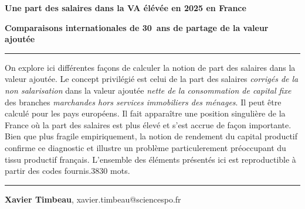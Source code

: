 \documentclass[
  french,
  9pt,
  a4paper,
]{article}
\renewcommand*\contentsname{Table des matières}
\newcommand\contentsname{Table des matières}
\begin{document}
\begin{titlepage}
\newpage
\pagestyle{empty}
\newpage
\pagestyle{empty}
 
\LARGE\textbf{Une part des salaires dans la VA élévée en 2025 en France}

\large\textbf{Comparaisons internationales de 30~ans de partage de la
valeur ajoutée}

\vspace{1cm}


\par\rule{\textwidth}{0.5pt}

On explore ici différentes façons de calculer la notion de part des
salaires dans la valeur ajoutée. Le concept privilégié est celui de la
part des salaires \emph{corrigés de la non salarisation} dans la valeur
ajoutée \emph{nette de la consommation de capital fixe} des branches
\emph{marchandes hors services immobiliers des ménages}. Il peut être
calculé pour les pays européens. Il fait apparaître une position
singulière de la France où la part des salaires est plus élevé et s'est
accrue de façon importante. Bien que plus fragile empiriquement, la
notion de rendement du capital productif confirme ce diagnostic et
illustre un problème particulerement préoccupant du tissu productif
français. L'ensemble des éléments présentés ici est reproductible à
partir des codes fournis.3830 mots.

\par\rule{\textwidth}{0.5pt}


\vspace{1cm}

\begin{flushright}
   \linespread{1}\small{\textbf{Xavier
Timbeau}}, {\small{xavier.timbeau@sciencespo.fr}}\par
\end{flushright}
\end{titlepage}
\renewcommand*\contentsname{Table des matières}
{
\hypersetup{linkcolor=}
\setcounter{tocdepth}{1}
\tableofcontents
}
\end{document}
